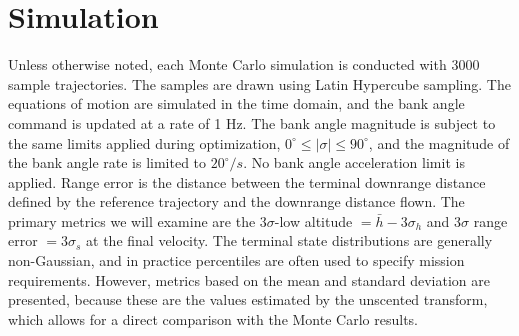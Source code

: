 \section{Simulation}
Unless otherwise noted, each Monte Carlo simulation is conducted with 3000 sample trajectories. The samples are drawn using Latin Hypercube sampling. The equations of motion are simulated in the time domain, and the bank angle command is updated at a rate of 1 Hz. The bank angle magnitude is subject to the same limits applied during optimization, $0^{\circ}\le|\sigma|\le90^{\circ}$, and the magnitude of the bank angle rate is limited to $20^{\circ}/s$. No bank angle acceleration limit is applied. Range error is the distance between the terminal downrange distance defined by the reference trajectory and the downrange distance flown. The primary metrics we will examine are the 3$\sigma$-low altitude $=\bar{h}-3\sigma_h$ and 3$\sigma$ range error $= 3\sigma_s$ at the final velocity. The terminal state distributions are generally non-Gaussian, and in practice percentiles are often used to specify mission requirements. However, metrics based on the mean and standard deviation are presented, because these are the values estimated by the unscented transform, which allows for a direct comparison with the Monte Carlo results.


